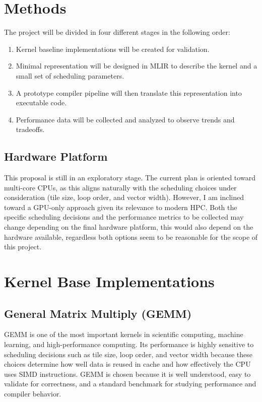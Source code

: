 \section*{Methods}

The project will be divided in four different stages in the following order:

\begin{enumerate}
\item Kernel baseline implementations will be created for validation. 
\item Minimal representation will be designed in MLIR to describe the kernel and a small set of scheduling parameters. 
\item A prototype compiler pipeline will then translate this representation into executable code. 
\item Performance data will be collected and analyzed to observe trends and tradeoffs.
\end{enumerate}

\subsection*{Hardware Platform}
This proposal is still in an exploratory stage. The current plan is oriented toward multi-core CPUs, as this aligns naturally with the scheduling choices under consideration (tile size, loop order, and vector width). However, I am inclined toward a GPU-only approach given its relevance to modern HPC. Both the specific scheduling decisions and the performance metrics to be collected may change depending on the final hardware platform, this would also depend on the hardware available, regardless both options seem to be reasonable for the scope of this project.

\section*{Kernel Base Implementations}

\subsection*{General Matrix Multiply (GEMM)} 

GEMM is one of the most important kernels in scientific computing, machine learning, and high-performance computing. Its performance is highly sensitive to scheduling decisions such as tile size, loop order, and vector width because these choices determine how well data is reused in cache and how effectively the CPU uses SIMD instructions. GEMM is chosen because it is well understood, easy to validate for correctness, and a standard benchmark for studying performance and compiler behavior.\\

